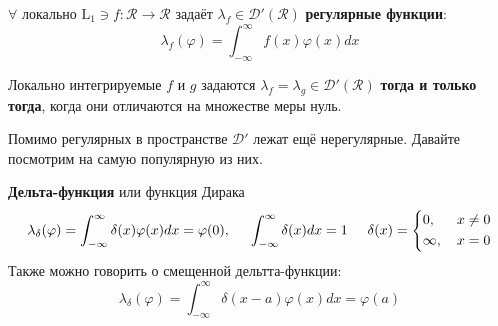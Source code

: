 \begin{to_def}
	$\forall$ локально $\text{L}_1 \ni f \colon \mathcal{R} \to \mathcal{R}$ задаёт $\lambda_f \in \mathcal{D}'(\mathcal{R})$ \textbf{регулярные функции}:
	\begin{equation*}
		\lambda_f(\varphi) = \int_{-\infty}^{\infty} f(x) \varphi(x) d x
	\end{equation*}
\end{to_def}

\begin{to_lem}
	Локально интегрируемые $f$ и $g$ задаются $\lambda_f = \lambda_g \in \mathcal{D}'(\mathcal{R})$ \textbf{тогда и только тогда}, когда они отличаются на множестве меры нуль. 
\end{to_lem}

Помимо регулярных в пространстве $\mathcal{D}'$ лежат ещё нерегулярные. Давайте посмотрим на самую популярную из них.

\begin{to_def}
	\textbf{Дельта-функция} или функция Дирака
	\begin{equation*}
		\lambda_\delta (\varphi)= \int_{-\infty}^{\infty} \delta(x) \varphi(x) d x = \varphi(0),
		\hspace{0.5 cm}
		\int_{-\infty}^{\infty} \delta(x) d x = 1
		\hspace{0.5 cm}
		\delta(x) = \left\{
		\begin{aligned}
			&0, \, &x \neq 0\\
			&\infty, \, &x = 0
		\end{aligned}\right.
	\end{equation*}
	Также можно говорить о смещенной дельтта-функции:
	\begin{equation*}
		\lambda_\delta (\varphi) = \int_{-\infty}^{\infty} \delta(x-a) \varphi(x) d x = \varphi(a)
	\end{equation*}
\end{to_def}